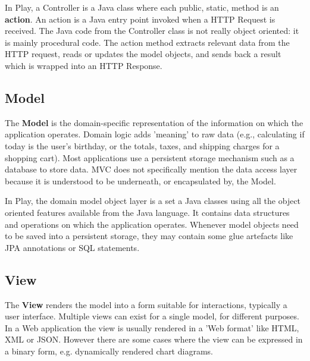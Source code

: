 In Play, a Controller is a Java class where each public, static, method is an \textbf{action}.
An action is a Java entry point invoked when a HTTP Request is received.
The Java code from the Controller class is not really object oriented: it is mainly procedural code.
The action method extracts relevant data from the HTTP request, reads or updates the model objects, and sends back a result which is wrapped into an HTTP Response.

\subsection{Model}
The \textbf{Model} is the domain-specific representation of the information on which the application operates.
Domain logic adds 'meaning' to raw data (e.g., calculating if today is the user's birthday, or the totals, taxes, and shipping charges for a shopping cart).
 Most applications use a persistent storage mechanism such as a database to store data.
MVC does not specifically mention the data access layer because it is understood to be underneath, or encapsulated by, the Model.

In Play, the domain model object layer is a set a Java classes using all the object oriented features available from the Java language. 
It contains data structures and operations on which the application operates. 
Whenever model objects need to be saved into a persistent storage, they may contain some glue artefacts like JPA annotations or SQL statements.

\subsection{View}
The \textbf{View} renders the model into a form suitable for interactions, typically a user interface.
Multiple views can exist for a single model, for different purposes.
In a Web application the view is usually rendered in a 'Web format' like HTML, XML or JSON.
However there are some cases where the view can be expressed in a binary form, e.g. dynamically rendered chart diagrams.


